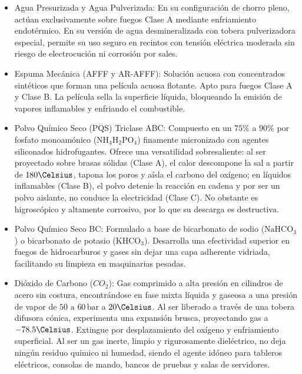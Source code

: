 \begin{itemize}
    \item Agua Presurizada y Agua Pulverizada: En su configuración de chorro pleno, actúan exclusivamente sobre fuegos
          Clase A mediante enfriamiento endotérmico. En su versión de agua desmineralizada con tobera pulverizadora especial,
          permite su uso seguro en recintos con tensión eléctrica moderada sin riesgo de electrocución ni corrosión por sales.
    \item Espuma Mecánica (AFFF y AR-AFFF): Solución acuosa con concentrados sintéticos que forman una
          película acuosa flotante. Apto para fuegos Clase A y Clase B. La película
          sella la superficie líquida, bloqueando la emisión de vapores inflamables y enfriando el
          combustible. 
    \item Polvo Químico Seco (PQS) Triclase ABC: Compuesto en un $75\percent$ a $90\percent$ por fosfato monoamónico
          ($\mathrm{NH_4H_2PO_4}$) finamente micronizado con agentes siliconados hidrofugantes. Ofrece una versatilidad
          sobresaliente: al ser proyectado sobre brasas sólidas (Clase A), el calor descompone la sal a partir de
          $180\Celsius$, tapona los poros y aísla el carbono del oxígeno; en líquidos inflamables (Clase B), el polvo
          detenie la reacción en cadena y por ser un polvo aislante, no conduce la electricidad (Clase C). No obstante
          es higroscópico y altamente corrosivo, por lo que su descarga es destructiva.
    \item Polvo Químico Seco BC: Formulado a base de bicarbonato de sodio ($\mathrm{NaHCO_3}$) o bicarbonato de potasio
          ($\mathrm{KHCO_3}$). Desarrolla una efectividad superior en fuegos de hidrocarburos y gases sin
          dejar una capa adherente vidriada, facilitando su limpieza en maquinarias pesadas.
    \item Dióxido de Carbono ($CO_2$): Gas comprimido a alta presión en cilindros de acero sin costura, encontrándose en
          fase mixta líquida y gaseosa a una presión de vapor de $50\text{ a }60\,\mathrm{bar}$ a $20\Celsius$. Al ser
          liberado a través de una tobera difusora cónica, experimenta una expansión brusca, proyectando gas a
          $-78.5\Celsius$. Extingue por desplazamiento del oxígeno y enfriamiento superficial. Al ser un gas inerte,
          limpio y rigurosamente dieléctrico, no deja ningún residuo químico ni humedad, siendo el agente idóneo para
          tableros eléctricos, consolas de mando, bancos de pruebas y salas de servidores.

\end{itemize}
